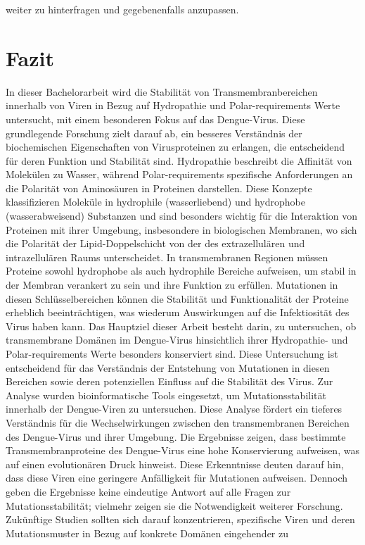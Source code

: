 \documentclass[german,version-2022-01]{uzl-thesis}
\begin{document}
weiter zu hinterfragen und gegebenenfalls anzupassen.

\chapter{Fazit}


%

In dieser Bachelorarbeit wird die Stabilit\"at von Transmembranbereichen innerhalb von Viren in Bezug auf Hydropathie und Polar-requirements Werte untersucht, mit einem besonderen Fokus auf das Dengue-Virus. Diese grundlegende Forschung zielt darauf ab, ein besseres Verst\"andnis der biochemischen Eigenschaften von Virusproteinen zu erlangen, die entscheidend f\"ur deren Funktion und Stabilit\"at sind. Hydropathie beschreibt die Affinit\"at von Molek\"ulen zu Wasser, w\"ahrend Polar-requirements spezifische Anforderungen an die Polarit\"at von Aminos\"auren in Proteinen darstellen. Diese Konzepte klassifizieren Molek\"ule in hydrophile (wasserliebend) und hydrophobe (wasserabweisend) Substanzen und sind besonders wichtig f\"ur die Interaktion von Proteinen mit ihrer Umgebung, insbesondere in biologischen Membranen, wo sich die Polarit\"at der Lipid-Doppelschicht von der des extrazellul\"aren und intrazellul\"aren Raums unterscheidet. In transmembranen Regionen m\"ussen Proteine sowohl hydrophobe als auch hydrophile Bereiche aufweisen, um stabil in der Membran verankert zu sein und ihre Funktion zu erf\"ullen. Mutationen in diesen Schl\"usselbereichen k\"onnen die Stabilit\"at und Funktionalit\"at der Proteine erheblich beeintr\"achtigen, was wiederum Auswirkungen auf die Infektiosit\"at des Virus haben kann. Das Hauptziel dieser Arbeit besteht darin, zu untersuchen, ob transmembrane Dom\"anen im Dengue-Virus hinsichtlich ihrer Hydropathie- und Polar-requirements Werte besonders konserviert sind. Diese Untersuchung ist entscheidend f\"ur das Verst\"andnis der Entstehung von Mutationen in diesen Bereichen sowie deren potenziellen Einfluss auf die Stabilit\"at des Virus. Zur Analyse wurden bioinformatische Tools eingesetzt, um Mutationsstabilit\"at innerhalb der Dengue-Viren zu untersuchen. Diese Analyse f\"ordert ein tieferes Verst\"andnis f\"ur die Wechselwirkungen zwischen den transmembranen Bereichen des Dengue-Virus und ihrer Umgebung. Die Ergebnisse zeigen, dass bestimmte Transmembranproteine des Dengue-Virus eine hohe Konservierung aufweisen, was auf einen evolution\"aren Druck hinweist. Diese Erkenntnisse deuten darauf hin, dass diese Viren eine geringere Anf\"alligkeit f\"ur Mutationen aufweisen. Dennoch geben die Ergebnisse keine eindeutige Antwort auf alle Fragen zur Mutationsstabilit\"at; vielmehr zeigen sie die Notwendigkeit weiterer Forschung. Zuk\"unftige Studien sollten sich darauf konzentrieren, spezifische Viren und deren Mutationsmuster in Bezug auf konkrete Dom\"anen eingehender zu 
\end{document}
